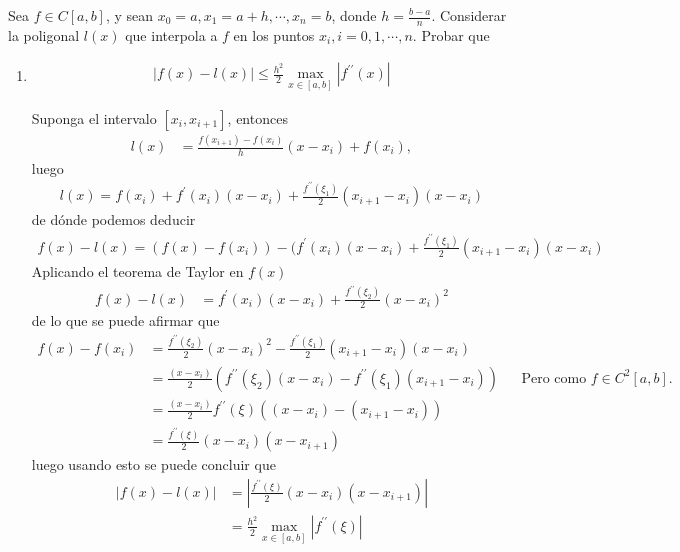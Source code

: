 \begin{homeworkProblem}
  Sea $f \in C[a,b]$, y sean $x_0= a,x_1 = a + h,\cdots,x_n=b$, donde $h=\frac{b-a}{n}$. Considerar la poligonal $l(x)$ que interpola a $f$ en los puntos $x_i,i=0,1,\cdots,n$. Probar que
  \begin{enumerate}
    \item \begin{align*}
      |f(x)-l(x)|\leq \frac{h^2}{2}\max_{x\in[a,b]}|f^{\prime\prime}(x)|
    \end{align*}
      \begin{solucion}
        Suponga el intervalo $[x_{i},x_{i+1}]$, entonces
        \begin{align*}
          l(x)&=\frac{f(x_{i+1})-f(x_i)}{h}(x-x_{i})+f(x_i),
        \end{align*}
        luego
        \begin{align*}
          l(x)=f(x_i)+f^{\prime}(x_i)(x-x_{i})+\frac{f^{\prime\prime}(\xi_1)}{2}(x_{i+1}-x_{i})(x-x_{i})
        \end{align*}
        de dónde podemos deducir
        \begin{align*}
          f(x)-l(x)=(f(x)-f(x_i))-(f^{\prime}(x_i)(x-x_i)+\frac{f^{\prime\prime}(\xi_1)}{2}(x_{i+1}-x_{i})(x-x_{i})
        \end{align*}
        Aplicando el teorema de Taylor en $f(x)$
        \begin{align*}
          f(x)-l(x)&=f^{\prime}(x_i)(x-x_i)+\frac{f^{\prime\prime}(\xi_2)}{2}(x-x_i)^2
        \end{align*}
        de lo que se puede afirmar que
        \begin{align*}
          f(x)-f(x_i)&=\frac{f^{\prime\prime}(\xi_2)}{2}(x-x_i)^2-\frac{f^{\prime\prime}(\xi_1)}{2}(x_{i+1}-x_{i})(x-x_i)\\
          &=\frac{(x-x_i)}{2}\left( f^{\prime\prime}(\xi_2)(x-x_i)-f^{\prime\prime}(\xi_1)(x_{i+1}-x_{i}) \right) &&\text{Pero como $f\in C^2[a,b]$.}\\
          &=\frac{(x-x_i)}{2}f^{\prime\prime}(\xi)((x-x_i)-(x_{i+1}-x_{i}))\\
          &=\frac{f^{\prime\prime}(\xi)}{2}(x-x_i)(x-x_{i+1})
        \end{align*}
        luego usando esto se puede concluir que
        \begin{align*}
          |f(x)-l(x)|&=\left| \frac{f^{\prime\prime}(\xi)}{2}(x-x_i)(x-x_{i+1}) \right|\\
          &=\frac{h^2}{2}\max_{x\in[a,b]}|f^{\prime\prime}(\xi)|

\end{align*}
\end{solucion}
\end{enumerate}
\end{homeworkProblem}
